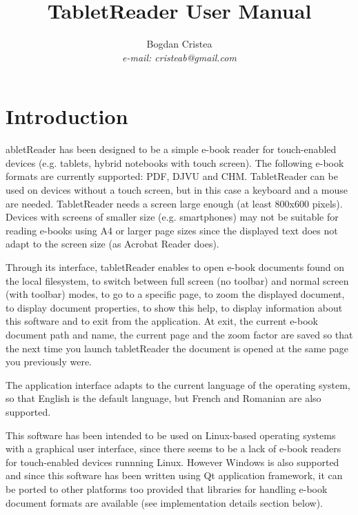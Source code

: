 \documentclass[journal,12pt]{IEEEtran}
\begin{document}
\title{TabletReader User Manual}
\author{Bogdan Cristea\\\textit{e-mail: cristeab@gmail.com}}

\maketitle

\section{Introduction}

abletReader has been designed to be a simple e-book reader for touch-enabled devices (e.g. tablets, hybrid notebooks with touch screen). The following e-book formats are currently supported: PDF, DJVU and CHM. TabletReader can be used on devices without a touch screen, but in this case a keyboard and a mouse are needed. TabletReader needs a screen large enough (at least 800x600 pixels). Devices with screens of smaller size (e.g. smartphones) may not be suitable for reading e-books using A4 or larger page sizes since the displayed text does not adapt to the screen size (as Acrobat Reader does).

Through its interface, tabletReader enables to open e-book documents found on the local filesystem, to switch between full screen (no toolbar) and normal screen (with toolbar) modes, to go to a specific page, to zoom the displayed document, to display document properties, to show this help, to display information about this software and to exit from the application. At exit, the current e-book document path and name, the current page and the zoom factor are saved so that the next time you launch tabletReader the document is opened at the same page you previously were. 

The application interface adapts to the current language of the operating system, so that English is the default language, but French and Romanian are also supported.

This software has been intended to be used on Linux-based operating systems with a graphical user interface, since there seems to be a lack of e-book readers for touch-enabled devices runnning Linux. However Windows is also supported and since this software has been written using Qt application framework, it can be ported to other platforms too provided that libraries for handling e-book document formats are available (see implementation details section below).
\end{document}
